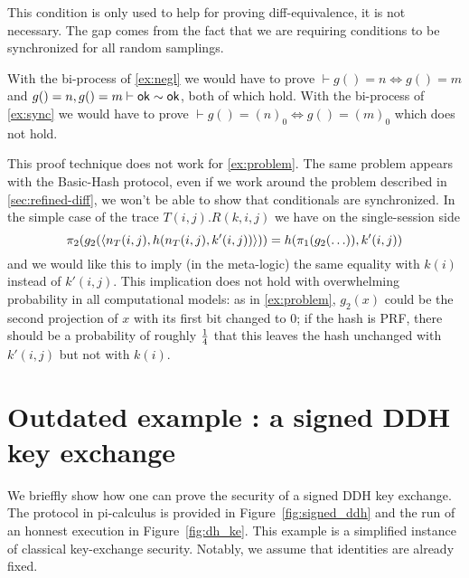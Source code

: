 This condition is only used to help for proving diff-equivalence, it is not necessary.
The gap comes from the fact that we are requiring conditions to be
synchronized for all random samplings.

\begin{example}
  With the bi-process of \cref{ex:negl} we would have to prove
  $\vdash g() = n \Leftrightarrow g() = m$ and
  $g()=n, g()=m \vdash \mathsf{ok} \sim \mathsf{ok}$, both of which hold.
  With the bi-process of \cref{ex:sync} we would have to prove
  $\vdash g() = (n)_0 \Leftrightarrow g() = (m)_0$ which does not hold.
\end{example}

\begin{example} \label{ex:indep}
  This proof technique does not work for \cref{ex:problem}.
  The same problem appears with the Basic-Hash protocol, even if we work around
the problem described in \cref{sec:refined-diff}, we won't be able to show
that conditionals are synchronized.  In the simple case of the trace
$T(i,j).R(k,i,j)$ we have
on the single-session side
$$\pi_2(g_2(\langle n_T(i,j),h(n_T(i,j),k'(i,j)) \rangle)) =
 h(\pi_1(g_2(\ldots)),k'(i,j))$$
and we would like this to imply (in the meta-logic)
the same equality with $k(i)$ instead of $k'(i,j)$.
This implication does not hold with overwhelming probability in all
computational models: as in \cref{ex:problem}, $g_2(x)$ could be the second
projection of $x$ with its first bit changed to $0$; if the hash is PRF,
there should be a probability of roughly $1 \over 4$ that this leaves
the hash unchanged with $k'(i,j)$ but not with $k(i)$.
\end{example}

\section{Outdated example : a signed DDH key exchange}

We brieffly show how one can prove the security of a signed DDH key exchange. The protocol in pi-calculus is provided in Figure~\ref{fig:signed_ddh} and the run of an honnest execution in Figure~\ref{fig:dh_ke}. This example is a simplified instance of classical key-exchange security. Notably, we assume that identities are already fixed.

